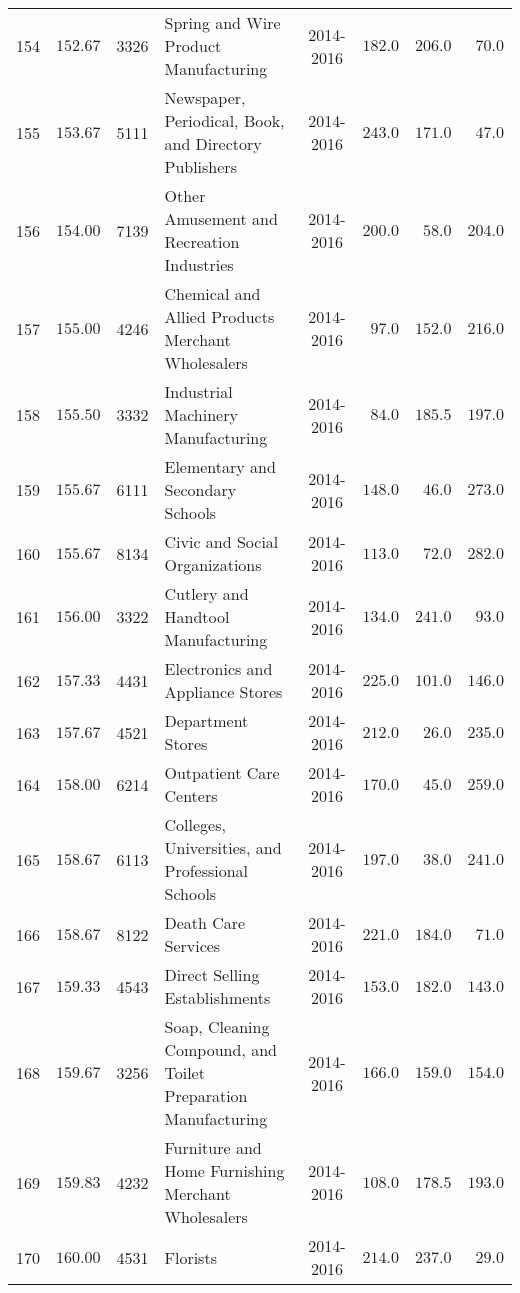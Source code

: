 \documentclass[9pt, oneside]{article}   	%
\begin{document}
\begin{longtable}{cccp{2.0in}cccc}
154  & $152.67$ & 3326 & Spring and Wire Product Manufacturing & 2014-2016 & $182.0$ & $206.0$ & $\phantom{0}70.0$ \\
155  & $153.67$ & 5111 & Newspaper, Periodical, Book, and Directory Publishers & 2014-2016 & $243.0$ & $171.0$ & $\phantom{0}47.0$ \\
156  & $154.00$ & 7139 & Other Amusement and Recreation Industries & 2014-2016 & $200.0$ & $\phantom{0}58.0$ & $204.0$ \\
157  & $155.00$ & 4246 & Chemical and Allied Products Merchant Wholesalers & 2014-2016 & $\phantom{0}97.0$ & $152.0$ & $216.0$ \\
158  & $155.50$ & 3332 & Industrial Machinery Manufacturing & 2014-2016 & $\phantom{0}84.0$ & $185.5$ & $197.0$ \\
159  & $155.67$ & 6111 & Elementary and Secondary Schools & 2014-2016 & $148.0$ & $\phantom{0}46.0$ & $273.0$ \\
160  & $155.67$ & 8134 & Civic and Social Organizations & 2014-2016 & $113.0$ & $\phantom{0}72.0$ & $282.0$ \\
161  & $156.00$ & 3322 & Cutlery and Handtool Manufacturing & 2014-2016 & $134.0$ & $241.0$ & $\phantom{0}93.0$ \\
162  & $157.33$ & 4431 & Electronics and Appliance Stores & 2014-2016 & $225.0$ & $101.0$ & $146.0$ \\
163  & $157.67$ & 4521 & Department Stores & 2014-2016 & $212.0$ & $\phantom{0}26.0$ & $235.0$ \\
164  & $158.00$ & 6214 & Outpatient Care Centers & 2014-2016 & $170.0$ & $\phantom{0}45.0$ & $259.0$ \\
165  & $158.67$ & 6113 & Colleges, Universities, and Professional Schools & 2014-2016 & $197.0$ & $\phantom{0}38.0$ & $241.0$ \\
166  & $158.67$ & 8122 & Death Care Services & 2014-2016 & $221.0$ & $184.0$ & $\phantom{0}71.0$ \\
167  & $159.33$ & 4543 & Direct Selling Establishments & 2014-2016 & $153.0$ & $182.0$ & $143.0$ \\
168  & $159.67$ & 3256 & Soap, Cleaning Compound, and Toilet Preparation Manufacturing & 2014-2016 & $166.0$ & $159.0$ & $154.0$ \\
169  & $159.83$ & 4232 & Furniture and Home Furnishing Merchant Wholesalers & 2014-2016 & $108.0$ & $178.5$ & $193.0$ \\
170  & $160.00$ & 4531 & Florists & 2014-2016 & $214.0$ & $237.0$ & $\phantom{0}29.0$ \\

\end{longtable}
\end{document}

